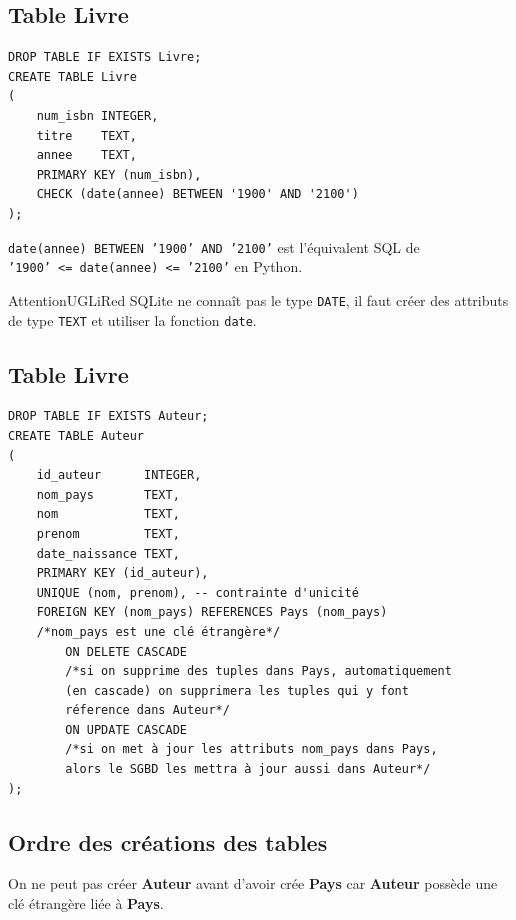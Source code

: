 \subsection{Table \textbf{Livre}}


\begin{sql}
    \begin{verbatim}
DROP TABLE IF EXISTS Livre;
CREATE TABLE Livre
(
    num_isbn INTEGER,
    titre    TEXT,
    annee    TEXT,
    PRIMARY KEY (num_isbn),
    CHECK (date(annee) BETWEEN '1900' AND '2100')
);
\end{verbatim}
\end{sql}

\texttt{date(annee) BETWEEN '1900' AND '2100'} est l'équivalent SQL de\\\texttt{'1900' <= date(annee) <= '2100'} en Python.

\begin{encadrecolore}{Attention}{UGLiRed}
    SQLite ne connaît pas le type \texttt{DATE}, il faut créer des attributs de type \texttt{TEXT} et utiliser la fonction \texttt{date}. 
\end{encadrecolore}

\subsection{Table \textbf{Livre}}
\begin{sql}
    \begin{verbatim}
DROP TABLE IF EXISTS Auteur;
CREATE TABLE Auteur
(
    id_auteur      INTEGER,
    nom_pays       TEXT,
    nom            TEXT,
    prenom         TEXT,
    date_naissance TEXT,
    PRIMARY KEY (id_auteur),
    UNIQUE (nom, prenom), -- contrainte d'unicité
    FOREIGN KEY (nom_pays) REFERENCES Pays (nom_pays)
    /*nom_pays est une clé étrangère*/
        ON DELETE CASCADE
        /*si on supprime des tuples dans Pays, automatiquement
        (en cascade) on supprimera les tuples qui y font
        réference dans Auteur*/
        ON UPDATE CASCADE
        /*si on met à jour les attributs nom_pays dans Pays,
        alors le SGBD les mettra à jour aussi dans Auteur*/
);\end{verbatim}
\end{sql}

\subsection{Ordre des créations des tables}
On ne peut pas créer \textbf{Auteur} avant d'avoir crée \textbf{Pays} car \textbf{Auteur} possède une clé étrangère liée à \textbf{Pays}.


